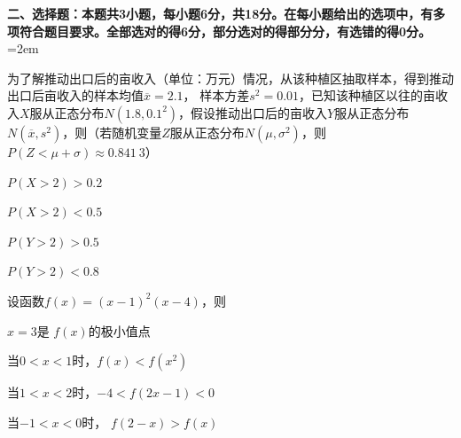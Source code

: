\documentclass[a4paper, 11pt]{article}
\begin{document}
\noindent \textbf{二、选择题：本题共3小题，每小题6分，共18分。在每小题给出的选项中，有多项符合题目要求。全部选对的得6分，部分选对的得部分分，有选错的得0分。}\hangindent=2em

\begin{question}
	为了解推动出口后的亩收入（单位：万元）情况，从该种植区抽取样本，得到推动出口后亩收入的样本均值$\overline{x}=2.1$， 样本方差$s^2=0.01$，已知该种植区以往的亩收入$X$服从正态分布$N\left(1.8, 0.1^2\right)$，假设推动出口后的亩收入$Y$服从正态分布$N\left(\overline{x},s^2\right)$，则（若随机变量$Z$服从正态分布$N\left(\mu,\sigma^2\right)$，则$P(Z<\mu+\sigma)\approx 0.841\: 3$）
		
	\begin{choices}
		\item $P(X>2)>0.2$
		\item $P(X>2)<0.5$
		\item $P(Y>2)>0.5$
		\item $P(Y>2)<0.8$
	\end{choices}
\end{question}

\begin{question}
	设函数$f(x)=\left(x-1\right)^2\left(x-4\right)$，则
	\begin{choices}
		\item $x=3$是 $f(x)$的极小值点
		\item 当$0<x<1$时，$f(x)<f\left(x^2\right)$
		\item 当$1<x<2$时，$-4<f(2x-1)<0$
		\item 当$-1<x<0$时， $f(2-x)>f(x)$
	\end{choices}
	
\end{question}
\end{document}

